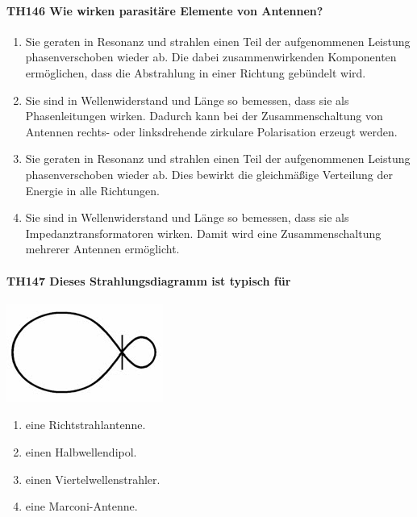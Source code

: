 \documentclass[8pt]{article}
\begin{document}
\paragraph*{TH146 Wie wirken parasitäre Elemente von Antennen?}
\begin{enumerate}[nolistsep,label=\Alph*]
\item Sie geraten in Resonanz und strahlen einen Teil der aufgenommenen Leistung phasenverschoben wieder ab. Die dabei zusammenwirkenden Komponenten ermöglichen, dass die Abstrahlung in einer Richtung gebündelt wird.
\item Sie sind in Wellenwiderstand und Länge so bemessen, dass sie als Phasenleitungen wirken. Dadurch kann bei der Zusammenschaltung von Antennen rechts- oder linksdrehende zirkulare Polarisation erzeugt werden.
\item Sie geraten in Resonanz und strahlen einen Teil der aufgenommenen Leistung phasenverschoben wieder ab. Dies bewirkt die gleichmäßige Verteilung der Energie in alle Richtungen.
\item Sie sind in Wellenwiderstand und Länge so bemessen, dass sie als Impedanztransformatoren wirken. Damit wird eine Zusammenschaltung mehrerer Antennen ermöglicht.
\end{enumerate}

\paragraph*{TH147 Dieses Strahlungsdiagramm ist typisch für}
\begin{center}
	\begin{minipage}{\linewidth}
		\centering
		\includegraphics[scale=1.0]{pics/th147_a.jpg}
	\end{minipage}
\end{center}
\begin{enumerate}[nolistsep,label=\Alph*]
\item eine Richtstrahlantenne.
\item einen Halbwellendipol.
\item einen Viertelwellenstrahler.
\item eine Marconi-Antenne.
\end{enumerate}
\end{document}
